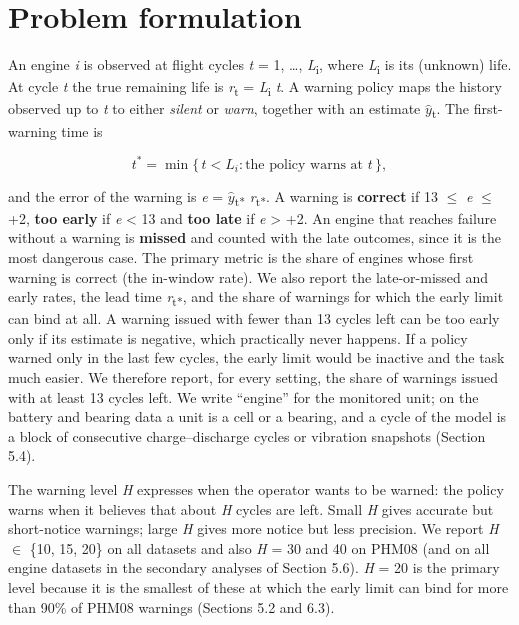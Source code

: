 \documentclass[a4paper,fleqn,doubleblind]{cas-dc}
\begin{document}
\section{Problem formulation}\label{sec:3}

An engine \textit{i} is observed at flight cycles \textit{t} = 1, \ldots{}, \textit{L}\textsubscript{i}, where \textit{L}\textsubscript{i} is its (unknown) life. At cycle \textit{t} the true remaining life is \textit{r}\textsubscript{t} = \textit{L}\textsubscript{i} \textminus{} \textit{t}. A warning policy maps the history observed up to \textit{t} to either \textit{silent} or \textit{warn}, together with an estimate $\hat{y}$\textsubscript{t}. The first-warning time is

\begin{equation}
t^{*} = \min\{\, t < L_i : \text{the policy warns at } t \,\},
\end{equation}

and the error of the warning is \textit{e} = $\hat{y}$\textsubscript{t*} \textminus{} \textit{r}\textsubscript{t*}. A warning is \textbf{correct} if \textminus{}13 $\le$ \textit{e} $\le$ +2, \textbf{too early} if \textit{e} < \textminus{}13 and \textbf{too late} if \textit{e} > +2. An engine that reaches failure without a warning is \textbf{missed} and counted with the late outcomes, since it is the most dangerous case. The primary metric is the share of engines whose first warning is correct (the in-window rate). We also report the late-or-missed and early rates, the lead time \textit{r}\textsubscript{t*}, and the share of warnings for which the early limit can bind at all. A warning issued with fewer than 13 cycles left can be too early only if its estimate is negative, which practically never happens. If a policy warned only in the last few cycles, the early limit would be inactive and the task much easier. We therefore report, for every setting, the share of warnings issued with at least 13 cycles left. We write ``engine'' for the monitored unit; on the battery and bearing data a unit is a cell or a bearing, and a cycle of the model is a block of consecutive charge--discharge cycles or vibration snapshots (Section 5.4).

The warning level \textit{H} expresses when the operator wants to be warned: the policy warns when it believes that about \textit{H} cycles are left. Small \textit{H} gives accurate but short-notice warnings; large \textit{H} gives more notice but less precision. We report \textit{H} $\in$ \{10, 15, 20\} on all datasets and also \textit{H} = 30 and 40 on PHM08 (and on all engine datasets in the secondary analyses of Section 5.6). \textit{H} = 20 is the primary level because it is the smallest of these at which the early limit can bind for more than 90\% of PHM08 warnings (Sections 5.2 and 6.3).
\end{document}
